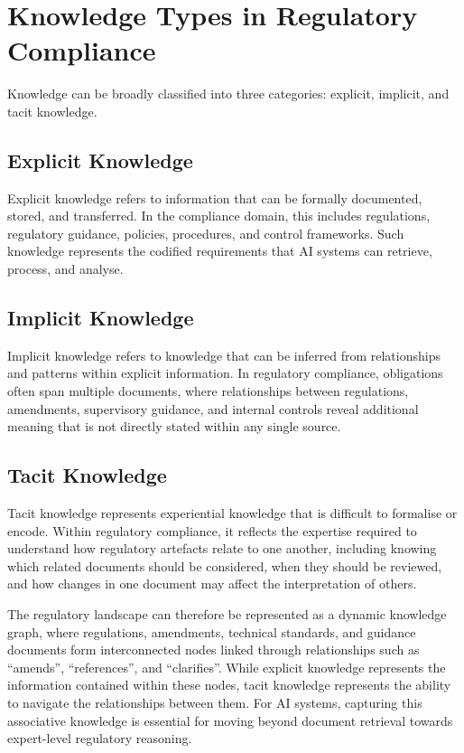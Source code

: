 \section{Knowledge Types in Regulatory Compliance}

Knowledge can be broadly classified into three categories: explicit, implicit, and tacit knowledge.

\subsection{Explicit Knowledge}

Explicit knowledge refers to information that can be formally documented, stored, and transferred. In the compliance domain, this includes regulations, regulatory guidance, policies, procedures, and control frameworks. Such knowledge represents the codified requirements that AI systems can retrieve, process, and analyse.

\subsection{Implicit Knowledge}

Implicit knowledge refers to knowledge that can be inferred from relationships and patterns within explicit information. In regulatory compliance, obligations often span multiple documents, where relationships between regulations, amendments, supervisory guidance, and internal controls reveal additional meaning that is not directly stated within any single source.

\subsection{Tacit Knowledge}

Tacit knowledge represents experiential knowledge that is difficult to formalise or encode. Within regulatory compliance, it reflects the expertise required to understand how regulatory artefacts relate to one another, including knowing which related documents should be considered, when they should be reviewed, and how changes in one document may affect the interpretation of others.

The regulatory landscape can therefore be represented as a dynamic knowledge graph, where regulations, amendments, technical standards, and guidance documents form interconnected nodes linked through relationships such as ``amends'', ``references'', and ``clarifies''. While explicit knowledge represents the information contained within these nodes, tacit knowledge represents the ability to navigate the relationships between them. For AI systems, capturing this associative knowledge is essential for moving beyond document retrieval towards expert-level regulatory reasoning.